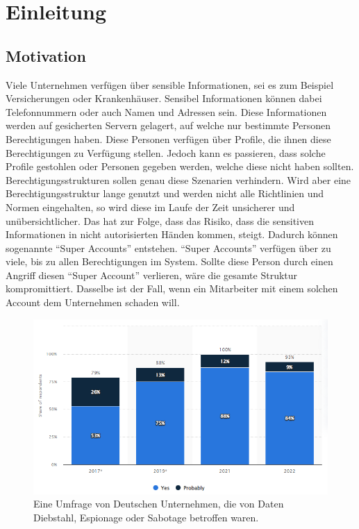 \chapter{Einleitung}
\label{ch:intro}

\section{Motivation}
\label{sec:intro:motivation}
Viele Unternehmen verfügen über sensible Informationen, sei es zum Beispiel Versicherungen oder Krankenhäuser. Sensibel Informationen können dabei Telefonnummern oder auch Namen und Adressen sein.
Diese Informationen werden auf gesicherten Servern gelagert, auf welche nur bestimmte Personen Berechtigungen haben.
Diese Personen verfügen über Profile, die ihnen diese Berechtigungen zu Verfügung stellen.
Jedoch kann es passieren, dass solche Profile gestohlen oder Personen gegeben werden, welche diese nicht haben sollten.
Berechtigungsstrukturen sollen genau diese Szenarien verhindern.
Wird aber eine Berechtigungsstruktur lange genutzt und werden nicht alle Richtlinien und Normen eingehalten, so wird diese im Laufe der Zeit unsicherer und unübersichtlicher.
Das hat zur Folge, dass das Risiko, dass die sensitiven Informationen in nicht autorisierten Händen kommen, steigt.
Dadurch können sogenannte "`Super Accounts"' entstehen.
"`Super Accounts"' verfügen über zu viele, bis zu allen Berechtigungen im System.
Sollte diese Person durch einen Angriff diesen "`Super Account"' verlieren, wäre die gesamte Struktur kompromittiert.
Dasselbe ist der Fall, wenn ein Mitarbeiter mit einem solchen Account dem Unternehmen schaden will.

\begin{figure}[h!]
 \centering
 \includegraphics[width=1\textwidth]{gfx/Picture/Cyber_Crime.PNG}
 \caption{Eine Umfrage von Deutschen Unternehmen, die von Daten Diebstahl, Espionage oder Sabotage betroffen waren. \cite{Stat22}}
 \label{fig:Crime}
\end{figure}

